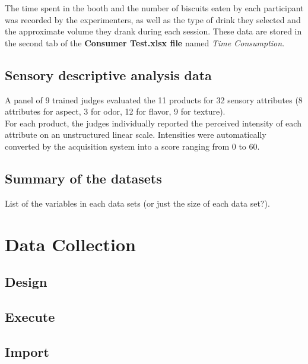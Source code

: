\documentclass[
]{book}
\begin{document}
The time spent in the booth and the number of biscuits eaten by each participant was recorded by the experimenters, as well as the type of drink they selected and the approximate volume they drank during each session. These data are stored in the second tab of the \textbf{Consumer Test.xlsx file} named \emph{Time Consumption}.

\hypertarget{sensory-descriptive-analysis-data}{%
\section{Sensory descriptive analysis data}\label{sensory-descriptive-analysis-data}}

A panel of 9 trained judges evaluated the 11 products for 32 sensory attributes (8 attributes for aspect, 3 for odor, 12 for flavor, 9 for texture).\\
For each product, the judges individually reported the perceived intensity of each attribute on an unstructured linear scale. Intensities were automatically converted by the acquisition system into a score ranging from 0 to 60.

\hypertarget{summary-of-the-datasets}{%
\section{Summary of the datasets}\label{summary-of-the-datasets}}

List of the variables in each data sets (or just the size of each data set?).

\hypertarget{data-collection}{%
\chapter{Data Collection}\label{data-collection}}

\hypertarget{design-1}{%
\section{Design}\label{design-1}}

\hypertarget{execute-1}{%
\section{Execute}\label{execute-1}}

\hypertarget{data-import}{%
\section{Import}\label{data-import}}
\end{document}
